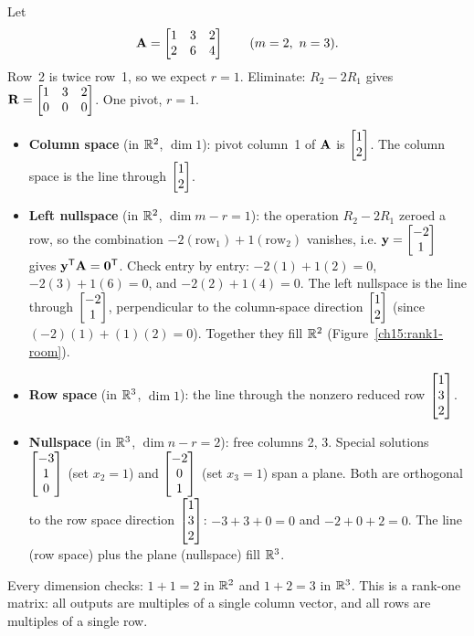 \begin{example}\label{ch15:full-worked}
Let
\[
  \mathbf{A} = \begin{bmatrix} 1 & 3 & 2\\ 2 & 6 & 4 \end{bmatrix}
  \qquad (m=2,\ n=3).
\]
Row~2 is twice row~1, so we expect $r=1$. Eliminate: $R_2-2R_1$ gives
$\mathbf{R}=\begin{bmatrix}1&3&2\\0&0&0\end{bmatrix}$. One pivot, $r=1$.
\begin{itemize}
  \item \textbf{Column space} (in $\mathbb{R}^2$, $\dim 1$): pivot column~1 of $\mathbf{A}$ is
  $\begin{bmatrix}1\\2\end{bmatrix}$. The column space is the line through $\begin{bmatrix}1\\2\end{bmatrix}$.
  \item \textbf{Left nullspace} (in $\mathbb{R}^2$, $\dim m-r=1$): the operation $R_2-2R_1$ zeroed a row,
  so the combination $-2(\text{row}_1)+1(\text{row}_2)$ vanishes, i.e. $\mathbf{y}=\begin{bmatrix}-2\\1\end{bmatrix}$
  gives $\mathbf{y}^{\mathsf{T}}\mathbf{A}=\mathbf{0}^{\mathsf{T}}$. Check entry by entry: $-2(1)+1(2)=0$, $-2(3)+1(6)=0$, and
  $-2(2)+1(4)=0$. The left nullspace is the line through $\begin{bmatrix}-2\\1\end{bmatrix}$, perpendicular to
  the column-space direction $\begin{bmatrix}1\\2\end{bmatrix}$ (since $(-2)(1)+(1)(2)=0$). Together they fill
  $\mathbb{R}^2$ (Figure~\ref{ch15:rank1-room}).
  \item \textbf{Row space} (in $\mathbb{R}^3$, $\dim 1$): the line through the nonzero reduced row
  $\begin{bmatrix}1\\3\\2\end{bmatrix}$.
  \item \textbf{Nullspace} (in $\mathbb{R}^3$, $\dim n-r=2$): free columns 2, 3. Special solutions
  $\begin{bmatrix}-3\\1\\0\end{bmatrix}$ (set $x_2=1$) and $\begin{bmatrix}-2\\0\\1\end{bmatrix}$ (set $x_3=1$) span a plane. Both are
  orthogonal to the row space direction $\begin{bmatrix}1\\3\\2\end{bmatrix}$: $-3+3+0=0$ and $-2+0+2=0$. The line
  (row space) plus the plane (nullspace) fill $\mathbb{R}^3$.
  \end{itemize}
Every dimension checks: $1+1=2$ in $\mathbb{R}^2$ and $1+2=3$ in $\mathbb{R}^3$. This is a rank-one matrix: all
outputs are multiples of a single column vector, and all rows are multiples of a single row.
\end{example}

